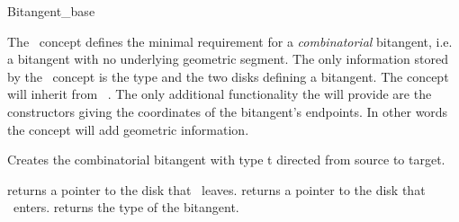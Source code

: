 
\ccRefPageBegin


\begin{ccRefConcept}{Bitangent_base}
\label{pageVC_Bitangent_baseRef}
  
The \ccRefName\ concept defines the minimal requirement for a
\emph{combinatorial} bitangent, i.e. a bitangent with no underlying geometric
segment. The only information stored by the \ccRefName\ concept is the type and
the two disks defining a bitangent. The  concept will inherit
from \ccRefName\ . The only additional functionality the  will
provide are the constructors giving the coordinates of the bitangent's
endpoints. In other words the  concept will add geometric
information.

\ccTypes
{}
\ccThreeToTwo

\ccGlue
{}
\ccGlue
{}

\ccThreeToTwo
\ccCreation
{}

\ccGlue
{}
{ Creates the combinatorial bitangent with type t directed from source to target. }
\ccGlue

\ccOperations

\ccTagFullDeclarations
{}
{returns a pointer to the disk that \ccVar\ leaves.}
\ccGlue
{}
{returns a pointer to the disk that \ccVar\ enters.}
\ccGlue
{}
{returns the type of the bitangent. }

\ccTagDefaults

\ccTagDefaults
\end{ccRefConcept}

\ccRefPageEnd

